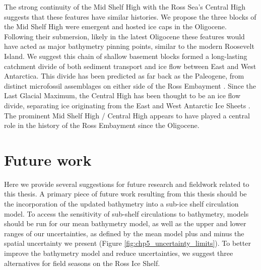The strong continuity of the Mid Shelf High with the Ross Sea's Central High suggests that these features have similar histories. We propose the three blocks of the Mid Shelf High were emergent and hosted ice caps in the Oligocene. Following their submersion, likely in the latest Oligocene \citep{olivettiice2023} these features would have acted as major bathymetry pinning points, similar to the modern Roosevelt Island. We suggest this chain of shallow basement blocks formed a long-lasting catchment divide of both sediment transport and ice flow between East and West Antarctica. This divide has been predicted as far back as the Paleogene, from distinct microfossil assemblages on either side of the Ross Embayment \citep{coenenpaleogene2019}. Since the Last Glacial Maximum, the Central High has been thought to be an ice flow divide, separating ice originating from the East and West Antarctic Ice Sheets \citep{liapatite2020, lichtupb2014, lichtprovenance2005}. The prominent Mid Shelf High / Central High appears to have played a central role in the history of the Ross Embayment since the Oligocene. 



\section{Future work}
Here we provide several suggestions for future research and fieldwork related to this thesis. A primary piece of future work resulting from this thesis should be the incorporation of the updated bathymetry into a sub-ice shelf circulation model. 
To access the sensitivity of sub-shelf circulations to bathymetry, models should be run for our mean bathymetry model, as well as the upper and lower ranges of our uncertainties, as defined by the mean model plus and minus the spatial uncertainty we present (Figure \ref{fig:chp5_uncertainty_limits}). 
To better improve the bathymetry model and reduce uncertainties, we suggest three alternatives for field seasons on the Ross Ice Shelf. 

